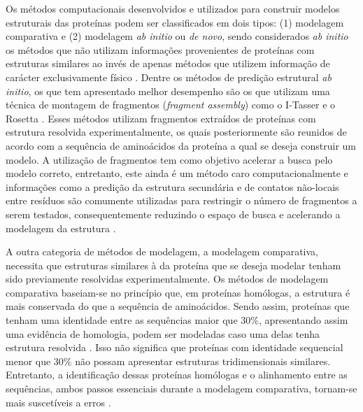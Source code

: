 Os métodos computacionais desenvolvidos e utilizados para construir modelos estruturais das proteínas podem ser classificados em dois tipos: (1) modelagem comparativa e (2) modelagem \textit{ab initio} ou \textit{de novo}, sendo considerados \textit{ab initio} os métodos que não utilizam informações provenientes de proteínas com estruturas similares ao invés de apenas métodos que utilizem informação de carácter exclusivamente físico \cite{Helles2008}. Dentre os métodos de predição estrutural \textit{ab initio}, os que tem apresentado melhor desempenho são os que utilizam uma técnica de montagem de fragmentos (\textit{fragment assembly}) como o I-Tasser \cite{Zhang2008a} e o Rosetta \cite{Rohl2004}. Esses métodos utilizam fragmentos extraídos de proteínas com estrutura resolvida experimentalmente, os quais posteriormente são reunidos de acordo com a sequência de aminoácidos da proteína a qual se deseja construir um modelo. A utilização de fragmentos tem como objetivo acelerar a busca pelo modelo correto, entretanto, este ainda é um método caro computacionalmente e informações como a predição da estrutura secundária e de contatos não-locais entre resíduos são comumente utilizadas para restringir o número de fragmentos a serem testados, consequentemente reduzindo o espaço de busca e acelerando a modelagem da estrutura \cite{Helles2008}.

A outra categoria de métodos de modelagem, a modelagem comparativa, necessita que estruturas similares à da proteína que se deseja modelar tenham sido previamente resolvidas experimentalmente. Os métodos de modelagem comparativa baseiam-se no princípio que, em proteínas homólogas, a estrutura é mais conservada do que a sequência de aminoácidos. Sendo assim, proteínas que tenham uma identidade entre as sequências maior que 30\%, apresentando assim uma evidência de homologia, podem ser modeladas caso uma delas tenha estrutura resolvida \cite{Marti-Renom2000}. Isso não significa que proteínas com identidade sequencial menor que 30\% não possam apresentar estruturas tridimensionais similares. Entretanto, a identificação dessas proteínas homólogas e o alinhamento entre as sequências, ambos passos essenciais durante a modelagem comparativa, tornam-se mais suscetíveis a erros \cite{Marti-Renom2000}. 

